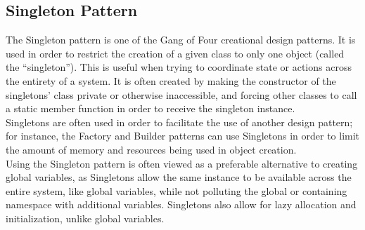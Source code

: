 \documentclass{article}
\begin{document}
    \subsection{Singleton Pattern}
    The Singleton pattern is one of the Gang of Four creational design patterns.
    It is used in order to restrict the creation of a given class to only one
    object (called the ``singleton''). This is useful when trying to coordinate
    state or actions across the entirety of a system. It is often created by
    making the constructor of the singletons' class private or otherwise
    inaccessible, and forcing other classes to call a static member function in
    order to receive the singleton instance.\\
    Singletons are often used in order to facilitate the use of another design
    pattern; for instance, the Factory and Builder patterns can use Singletons
    in order to limit the amount of memory and resources being used in object
    creation.\\
    Using the Singleton pattern is often viewed as a preferable alternative to
    creating global variables, as Singletons allow the same instance to be
    available across the entire system, like global variables, while not
    polluting the global or containing namespace with additional variables.
    Singletons also allow for lazy allocation and initialization, unlike global
    variables.
    \newpage
\end{document}
